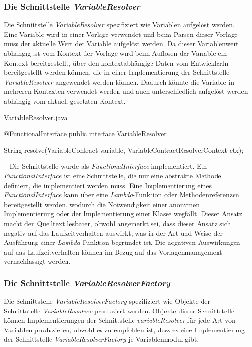 \subsubsection{Die Schnittstelle \emph{VariableResolver}}
\label{sec:variableResolver}
Die Schnittstelle \emph{VariableResolver} spezifiziert wie Variablen aufgelöst werden. Eine Variable wird in einer Vorlage verwendet und beim Parsen dieser Vorlage muss der aktuelle Wert der Variable aufgelöst werden. Da dieser Variablenwert abhängig ist vom Kontext der Vorlage wird beim Auflösen der Variable ein Kontext bereitgestellt, über den kontextabhängige Daten vom EntwicklerIn bereitgestellt werden können, die in einer Implementierung der Schnittstelle \emph{VariableResolver} angewendet werden können. Dadurch könnte die Variable in mehreren Kontexten verwendet werden und auch unterschiedlich aufgelöst werden abhängig vom aktuell gesetzten Kontext.
\begin{program}[h]
\caption{VariableResolver.java}
\label{prog:variableResolver}
\begin{JavaCode}
@FunctionalInterface
public interface VariableResolver {

    String resolve(VariableContract variable,
                   VariableContractResolverContext ctx);
}
\end{JavaCode}
\end{program}
\ \newline
Die Schnittstelle wurde als \emph{FunctionalInterface} implementiert. Ein \emph{FunctionalInterface} ist eine Schnittstelle, die nur eine abstrakte Methode definiert, die implementiert werden muss. Eine Implementierung eines \emph{FunctionalInterface} kann über eine \emph{Lambda}-Funktion oder Methodenreferenzen bereitgestellt werden, wodurch die Notwendigkeit einer anonymen Implementierung oder der Implementierung einer Klasse wegfällt. Dieser Ansatz macht den Quelltext lesbarer, obwohl angemerkt sei, dass dieser Ansatz sich negativ auf das Laufzeitverhalten auswirkt, was in der Art und Weise der Ausführung einer \emph{Lambda}-Funktion begründet ist. Die negativen Auswirkungen auf das Laufzeitverhalten können im Bezug auf das Vorlagenmanagement vernachlässigt werden.

\subsubsection{Die Schnittstelle \emph{VariableResolverFactory}}
\label{sec:variableResolverFactory}
Die Schnittstelle \emph{VariableResolverFactory} spezifiziert wie Objekte der Schnittstelle \emph{VariableResolver} produziert werden. Objekte dieser Schnittstelle können Implementierungen der Schnittstelle \emph{variableResolver} für jede Art von Variablen produzieren, obwohl es zu empfohlen ist, dass es eine Implementierung der Schnittstelle \emph{VariableResolverFactory} je Variablenmodul gibt.
\newpage

